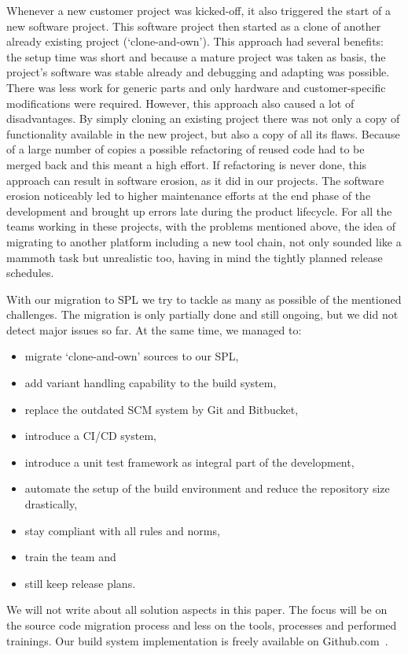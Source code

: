 Whenever a new customer project was kicked-off, it also triggered the start of a
new software project. This software project then started as a clone of another
already existing project (`clone-and-own'). This approach had several benefits:
the setup time was short and because a mature project was taken as basis, the
project's software was stable already and debugging and adapting was possible.
There was less work for generic parts and only hardware and customer-specific
modifications were required. However, this approach also caused a lot of
disadvantages. By simply cloning an existing project there was not only a copy
of functionality available in the new project, but also a copy of all its flaws.
Because of a large number of copies a possible refactoring of reused code had to
be merged back and this meant a high effort. If refactoring is never done, this
approach can result in software erosion, as it did in our projects. The software
erosion noticeably led to higher maintenance efforts at the end phase of the
development and brought up errors late during the product lifecycle. For all the
teams working in these projects, with the problems mentioned above, the idea of
migrating to another platform including a new tool chain, not only sounded like
a mammoth task but unrealistic too, having in mind the tightly planned release
schedules.

With our migration to SPL we try to tackle as many as possible of the mentioned
challenges. The migration is only partially done and still ongoing, but we did
not detect major issues so far. At the same time, we managed to:
\begin{itemize}
  \item migrate `clone-and-own' sources to our SPL,
  \item add variant handling capability to the build system,
  \item replace the outdated SCM system by Git and Bitbucket,
  \item introduce a CI/CD system,
  \item introduce a unit test framework as integral part of the development,
  \item automate the setup of the build environment and reduce the repository size drastically,
  \item stay compliant with all rules and norms,
  \item train the team and
  \item still keep release plans.
\end{itemize}

We will not write about all solution aspects in this paper. The focus will be
on the source code migration process and less on the tools, processes and
performed trainings. Our build system implementation is freely available on
Github.com~\cite{GithubSPL}.
